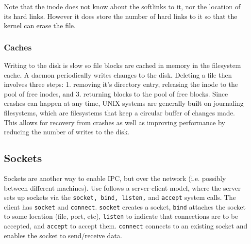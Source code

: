 \documentclass[../notes.tex]{subfiles}
\begin{document}
Note that the inode does not know about the softlinks to it, nor the location of its hard links. However it does store the number of hard links to it so that the kernel can erase the file.

\subsubsection{Caches}

Writing to the disk is slow so file blocks are cached in memory in the filesystem cache. A daemon periodically writes changes to the disk.
Deleting a file then involves three steps: 1. removing it's directory entry, releasing the inode to the pool of free inodes, and 3. returning blocks to the pool of free blocks.
Since crashes can happen at any time, UNIX systems are generally built on journaling filesystems, which are filesystems that keep a circular buffer of changes made. This allows for recovery from crashes as well as improving performance by reducing the number of writes to the disk. 






\subsection{Sockets}

Sockets are another way to enable IPC, but over the network (i.e. possibly between different machines).
Use follows a server-client model, where the server sets up sockets via the \texttt{socket, bind, listen,} and \texttt{accept} system calls. The client has \texttt{socket} and \texttt{connect}.
\texttt{socket} creates a socket, \texttt{bind} attaches the socket to some location (file, port, etc), \texttt{listen} to indicate that connections are to be accepted, and \texttt{accept} to accept them. \texttt{connect} connects to an existing socket and enables the socket to send/receive data.
\end{document}
